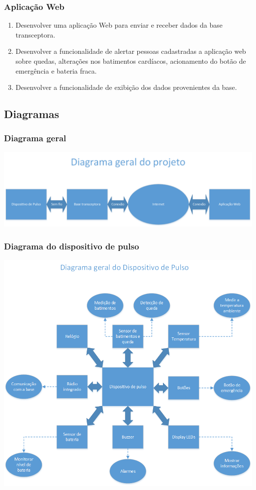 \documentclass[a4paper]{article}
\begin{document}
\subsubsection{Aplicação Web}
\begin{enumerate}
\item Desenvolver uma aplicação Web para enviar e receber dados da base transceptora.
\item Desenvolver a funcionalidade de alertar pessoas cadastradas a aplicação web sobre quedas, alterações nos batimentos cardíacos, acionamento do botão de emergência e bateria fraca.
\item Desenvolver a funcionalidade de exibição dos dados provenientes da base.
\end{enumerate}

\subsection{Diagramas}

\subsubsection{Diagrama geral}
\begin{center}
\includegraphics[scale=0.75]{figuras/diagrama_geral}
\end{center}

\subsubsection{Diagrama do dispositivo de pulso}
\begin{center}
\includegraphics[scale=0.75]{figuras/diagrama_pulso}
\end{center}
\end{document}
